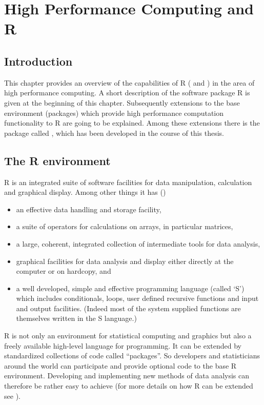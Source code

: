 \chapter{High Performance Computing and R}
\label{chap:Rhpc}
\section{Introduction}

This chapter provides an overview of the capabilities of R (\cite{IntrotoR}
and \cite{ihaka96rld}) in the area
of high performance computing. A short description of the
software package R is given at the beginning of this
chapter. Subsequently extensions to the base environment 
(packages) which provide high performance computation functionality to
R are going to be explained. Among these extensions there is the
package called , which has been developed in the course of
this thesis.

\section{The R environment}

R is an integrated suite of software facilities for data manipulation,
calculation and graphical display. Among other things it has (\cite{IntrotoR})
\begin{itemize}
\item an effective data handling and storage facility,
\item a suite of operators for calculations on arrays, in particular matrices,
\item a large, coherent, integrated collection of intermediate tools
  for data analysis,
\item graphical facilities for data analysis and display either
  directly at the computer or on hardcopy, and
\item a well developed, simple and effective programming language
  (called `S') which includes conditionals, loops, user defined
  recursive functions and input and output facilities. (Indeed most of
  the system supplied functions are themselves written in the S
  language.)
\end{itemize}

R is not only an environment for statistical computing and graphics
but also a freely available high-level language for programming. It
can be extended by standardized collections of code called
``packages''. So developers and statisticians around the world can
participate and provide optional code to the base R environment.
Developing and implementing new methods of data analysis can therefore
be rather easy to achieve (for more details on how R can be extended
see \cite{Rcore07Ext}). 

